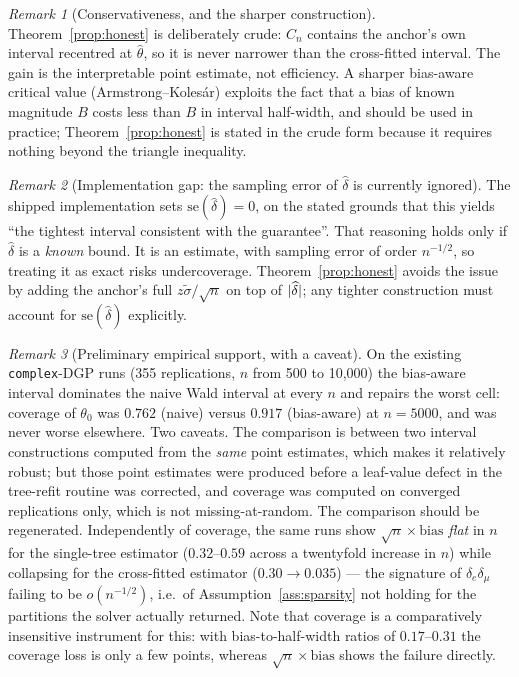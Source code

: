 \documentclass[11pt]{article}
\theoremstyle{plain}
\theoremstyle{definition}
\theoremstyle{remark}
\newtheorem{remark}{Remark}
\newcommand{\thetahat}{\widehat{\theta}}
\DeclarePairedDelimiter{\abs}{\lvert}{\rvert}
\begin{document}
\begin{remark}[Conservativeness, and the sharper construction]\label{rem:conservative}
Theorem~\ref{prop:honest} is deliberately crude: $C_n$ contains the anchor's own
interval recentred at $\thetahat$, so it is never narrower than the cross-fitted
interval. The gain is the interpretable point estimate, not efficiency. A sharper
bias-aware critical value (Armstrong--Koles\'ar) exploits the fact that a bias of
known magnitude $B$ costs less than $B$ in interval half-width, and should be used
in practice; Theorem~\ref{prop:honest} is stated in the crude form because it
requires nothing beyond the triangle inequality.
\end{remark}

\begin{remark}[Implementation gap: the sampling error of $\widehat\delta$ is
currently ignored]\label{rem:se-delta}
The shipped implementation sets $\mathrm{se}(\widehat\delta)=0$, on the stated
grounds that this yields ``the tightest interval consistent with the guarantee''.
That reasoning holds only if $\widehat\delta$ is a \emph{known} bound. It is an
estimate, with sampling error of order $n^{-1/2}$, so treating it as exact risks
undercoverage. Theorem~\ref{prop:honest} avoids the issue by adding the anchor's
full $z\widetilde\sigma/\sqrt n$ on top of $\abs{\widehat\delta}$; any tighter
construction must account for $\mathrm{se}(\widehat\delta)$ explicitly.
\end{remark}

\begin{remark}[Preliminary empirical support, with a caveat]\label{rem:empirics-outside}
On the existing \texttt{complex}-DGP runs (355 replications, $n$ from 500 to
10{,}000) the bias-aware interval dominates the naive Wald interval at every $n$
and repairs the worst cell: coverage of $\theta_0$ was $0.762$ (naive) versus
$0.917$ (bias-aware) at $n=5000$, and was never worse elsewhere. Two caveats. The
comparison is between two interval constructions computed from the \emph{same}
point estimates, which makes it relatively robust; but those point estimates were
produced before a leaf-value defect in the tree-refit routine was corrected, and
coverage was computed on converged replications only, which is not
missing-at-random. The comparison should be regenerated. Independently of
coverage, the same runs show $\sqrt n\times\mathrm{bias}$ \emph{flat} in $n$ for
the single-tree estimator ($0.32$--$0.59$ across a twentyfold increase in $n$)
while collapsing for the cross-fitted estimator ($0.30\to0.035$) --- the
signature of $\delta_e\delta_\mu$ failing to be $o(n^{-1/2})$, i.e.\ of
Assumption~\ref{ass:sparsity} not holding for the partitions the solver actually
returned. Note that coverage is a comparatively insensitive instrument for this:
with bias-to-half-width ratios of $0.17$--$0.31$ the coverage loss is only a few
points, whereas $\sqrt n\times\mathrm{bias}$ shows the failure directly.
\end{remark}
\end{document}
